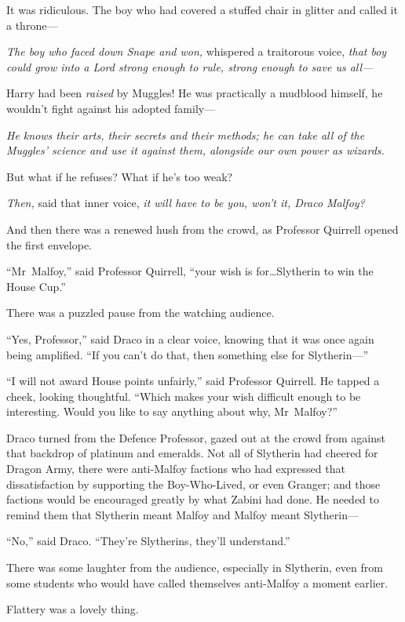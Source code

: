 It was ridiculous. The boy who had covered a stuffed chair in glitter and called it a throne—

\emph{The boy who faced down Snape and won,} whispered a traitorous voice, \emph{that boy could grow into a Lord strong enough to rule, strong enough to save us all—}

Harry had been \emph{raised} by Muggles! He was practically a mudblood himself, he wouldn’t fight against his adopted family—

\emph{He knows their arts, their secrets and their methods; he can take all of the Muggles’ science and use it against them, alongside our own power as wizards.}

But what if he refuses? What if he’s too weak?

\emph{Then,} said that inner voice, \emph{it will have to be you, won’t it, Draco Malfoy?}

And then there was a renewed hush from the crowd, as Professor Quirrell opened the first envelope.

“Mr~Malfoy,” said Professor Quirrell, “your wish is for…Slytherin to win the House Cup.”

There was a puzzled pause from the watching audience.

“Yes, Professor,” said Draco in a clear voice, knowing that it was once again being amplified. “If you can’t do that, then something else for Slytherin—”

“I will not award House points unfairly,” said Professor Quirrell. He tapped a cheek, looking thoughtful. “Which makes your wish difficult enough to be interesting. Would you like to say anything about why, Mr~Malfoy?”

Draco turned from the Defence Professor, gazed out at the crowd from against that backdrop of platinum and emeralds. Not all of Slytherin had cheered for Dragon Army, there were anti-Malfoy factions who had expressed that dissatisfaction by supporting the Boy-Who-Lived, or even Granger; and those factions would be encouraged greatly by what Zabini had done. He needed to remind them that Slytherin meant Malfoy and Malfoy meant Slytherin—

“No,” said Draco. “They’re Slytherins, they’ll understand.”

There was some laughter from the audience, especially in Slytherin, even from some students who would have called themselves anti-Malfoy a moment earlier.

Flattery was a lovely thing.


